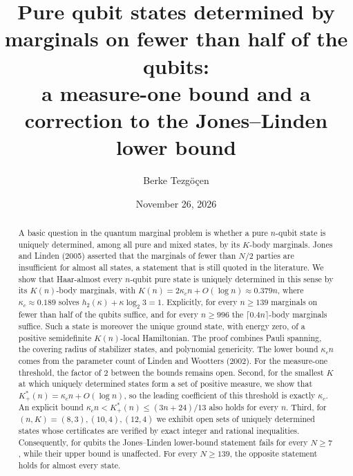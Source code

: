 \documentclass[aps,pra,onecolumn,superscriptaddress,nofootinbib,longbibliography,10pt]{revtex4-2}
\theoremstyle{definition}
\newcommand{\kc}{\kappa_c}
\newcommand{\Kp}{K^{*}_{+}}
\begin{document}
\title{Pure qubit states determined by marginals on fewer than half of the qubits:\\ a measure-one bound and a correction to the Jones--Linden lower bound}

\author{Berke Tezgöçen}

\date{November 26, 2026}

\begin{abstract}
A basic question in the quantum marginal problem is whether a pure $n$-qubit state is uniquely determined, among all pure and mixed states, by its $K$-body marginals. Jones and Linden (2005) asserted that the marginals of fewer than $N/2$ parties are insufficient for almost all states, a statement that is still quoted in the literature. We show that Haar-almost every $n$-qubit pure state is uniquely determined in this sense by its $K(n)$-body marginals, with $K(n)=2\kc n+O(\log n)\approx0.379n$, where $\kc\approx0.189$ solves $h_2(\kappa)+\kappa\log_2 3=1$. Explicitly, for every $n\ge139$ marginals on fewer than half of the qubits suffice, and for every $n\ge996$ the $\lceil0.4n\rceil$-body marginals suffice. Such a state is moreover the unique ground state, with energy zero, of a positive semidefinite $K(n)$-local Hamiltonian. The proof combines Pauli spanning, the covering radius of stabilizer states, and polynomial genericity. The lower bound $\kc n$ comes from the parameter count of Linden and Wootters (2002). For the measure-one threshold, the factor of 2 between the bounds remains open.
Second, for the smallest $K$ at which uniquely determined states form a set of positive measure, we show that $\Kp(n)=\kc n+O(\log n)$, so the leading coefficient of this threshold is exactly $\kc$. An explicit bound $\kc n<\Kp(n)\le(3n+24)/13$ also holds for every $n$. Third, for $(n,K)=(8,3),(10,4),(12,4)$ we exhibit open sets of uniquely determined states whose certificates are verified by exact integer and rational inequalities.
Consequently, for qubits the Jones--Linden lower-bound statement fails for every $N\ge7$, while their upper bound is unaffected. For every $N\ge139$, the opposite statement holds for almost every state.
\end{abstract}

\maketitle
\end{document}
